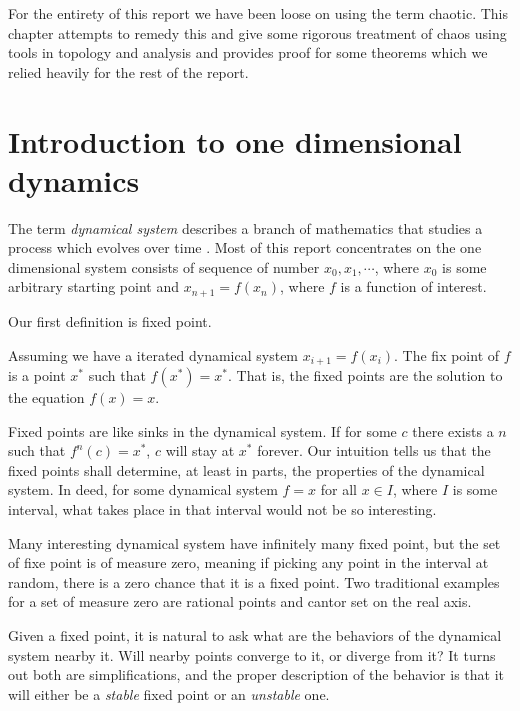 For the entirety of this report we have been loose on using the term chaotic.
This chapter attempts to remedy this and give some rigorous treatment of chaos using tools in topology and analysis and provides proof for some theorems which we relied heavily for the rest of the report.

\section{Introduction to one dimensional dynamics}

The term \emph{dynamical system} describes a branch of mathematics that studies a process which evolves over time \cite{Devaney_green_book_chaos_definition}.
Most of this report concentrates on the one dimensional system consists of sequence of number $x_0, x_1, \cdots$, where $x_0$ is some arbitrary starting point and $x_{n+1} = f(x_n)$, where $f$ is a function of interest. 

Our first definition is fixed point.

\begin{defn}
	Assuming we have a iterated dynamical system $x_{i+1} = f(x_i)$. 
	The fix point of $f$ is a point $x^*$ such that $f(x^*) = x^*$. 
	That is, the fixed points are the solution to the equation $f(x) = x$.
\end{defn}

Fixed points are like sinks in the dynamical system. 
If for some $c$ there exists a $n$ such that $f^n(c) = x^*$, $c$ will stay at $x^*$ forever. 
Our intuition tells us that the fixed points shall determine, at least in parts, the properties of the dynamical system.
In deed, for some dynamical system $f = x$ for all $x \in I$, where $I$ is some interval, what takes place in that interval would not be so interesting.

Many interesting dynamical system have infinitely many fixed point, but the set of fixe point is of measure zero, meaning if picking any point in the interval at random, there is a zero chance that it is a fixed point.
Two traditional examples for a set of measure zero are rational points and cantor set on the real axis. 

Given a fixed point, it is natural to ask what are the behaviors of the dynamical system nearby it.
Will nearby points converge to it, or diverge from it?
It turns out both are simplifications, and the proper description of the behavior is that it will either be a \emph{stable} fixed point or an \emph{unstable} one. 


